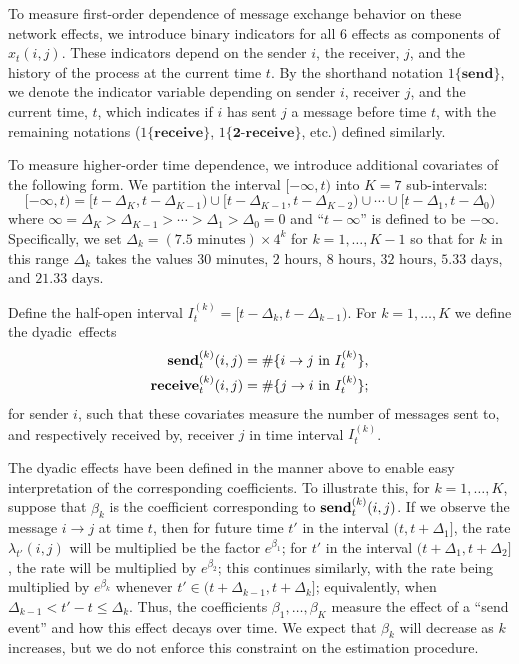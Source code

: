 \documentclass[final]{statsoc}
\begin{document}
To measure first-order dependence of message exchange behavior on these network effects, we introduce binary
indicators for all $6$ effects as components of $x_t(i,j)$.  These indicators
depend on the sender $i$, the receiver, $j$, and the history of the process at
the current time $t$.  By the shorthand notation $1\{\textbf{send}\}$, we denote
the indicator variable depending on sender $i$, receiver $j$, and the current
time, $t$,  which indicates if $i$ has sent $j$ a message before time $t$, with the remaining notations ($1\{\textbf{receive}\}$, $1\{\textbf{2-receive}\}$, etc.)
defined similarly.

To measure higher-order time dependence, we introduce additional covariates of the following form.  We partition the interval $[-\infty, t)$ into $K = 7$ sub-intervals:
\[
  [-\infty, t) =
  [t - \Delta_K, t - \Delta_{K-1}) \cup [t - \Delta_{K-1}, t - \Delta_{K-2}) \cup \dotsb \cup [t - \Delta_1, t - \Delta_0)
\]
where $\infty = \Delta_K > \Delta_{K-1} > \dotsb > \Delta_1 > \Delta_0 = 0$
and ``$t - \infty$'' is defined to be $-\infty$.  Specifically, we set
$\Delta_k = (7.5\text{ minutes}) \times 4^k$ for $k = 1, \dotsc, K-1$ so that
for $k$ in this range $\Delta_k$ takes the values $30\text{ minutes}$,
$2\text{ hours}$, $8\text{ hours}$, $32\text{ hours}$, $5.33\text{ days}$, and
$21.33\text{ days}$.

Define the half-open interval $I_{t}^{(k)} = [t - \Delta_k, t -
\Delta_{k-1})$.  For $k = 1, \dotsc, K$ we define the dyadic~effects
\begin{align*}
  \text{\textbf{send}}^{(k)}_t(i,j)
    &= \#\{ i \to j \text{ in } I_t^{(k)} \}, \\
  \text{\textbf{receive}}^{(k)}_t(i,j)
    &= \#\{ j \to i \text{ in } I_t^{(k)} \};
\end{align*}
for sender $i$, such that these covariates measure the number of messages sent to, and respectively received by, receiver $j$ in time interval $I_t^{(k)}$.

The dyadic effects have been defined in the manner above to enable easy interpretation of
the corresponding coefficients.  To illustrate this, for $k = 1, \dotsc, K$,
suppose that $\beta_{k}$ is the coefficient corresponding to
$\text{\textbf{send}}^{(k)}_t(i,j)$.  If we observe the message $i \to j$ at
time $t$, then for future time $t'$ in the interval $(t, t + \Delta_1]$, the
rate $\lambda_{t'}(i,j)$ will be multiplied be the factor $e^{\beta_{1}}$; for
$t'$ in the interval $(t + \Delta_1, t + \Delta_2]$, the rate will be
multiplied by $e^{\beta_{2}}$; this continues similarly, with the rate being
multiplied by $e^{\beta_{k}}$ whenever $t' \in (t + \Delta_{k-1}, t +
\Delta_{k}]$; equivalently, when $\Delta_{k-1} < t' - t \leq \Delta_k$.  Thus,
the coefficients $\beta_{1}, \dotsc, \beta_{K}$ measure the effect of a ``send
event'' and how this effect decays over time.  We expect that $\beta_{k}$ will
decrease as $k$ increases, but we do not enforce this constraint on the
estimation procedure.
\end{document}
